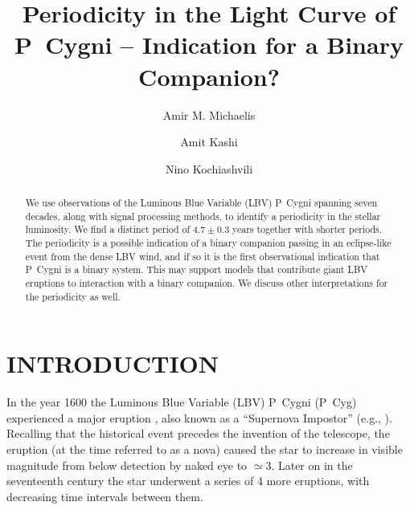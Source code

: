 \documentclass[twocolumn]{aastex62}
\begin{document}
\title{Periodicity in the Light Curve of P~Cygni -- Indication for a Binary Companion?}

\author[0000-0002-1361-9115]{Amir M. Michaelis}
\author[0000-0002-7840-0181]{Amit Kashi}
\author[0000-0001-5249-4354]{Nino Kochiashvili}





\begin{abstract}
We use observations of the Luminous Blue Variable (LBV) P~Cygni spanning seven decades, along with signal processing methods, to identify a periodicity in the stellar luminosity. 
We find a distinct period of $4.7 \pm 0.3$ years together with shorter periods.
The periodicity is a possible indication of a binary companion passing in an eclipse-like event from the dense LBV wind, and if so it is the first observational indication that P~Cygni is a binary system. This may support models that contribute giant LBV eruptions to interaction with a binary companion.
We discuss other interpretations for the periodicity as well.
\end{abstract}


\section{INTRODUCTION}
\label{sec:intro}

In the year 1600 the Luminous Blue Variable (LBV) P~Cygni (P~Cyg) experienced a major eruption \citep{deGroot1969,deGroot1988}, also known as a ``Supernova Impostor'' (e.g., \citealt{DavidsonHumphreys2012}).
Recalling that the historical event precedes the invention of the telescope,
the eruption (at the time referred to as a nova) caused the star to increase in visible magnitude from below detection by naked eye to $\simeq 3$.
Later on in the seventeenth century the star underwent a series of 4 more eruptions, with decreasing time intervals between them.
\end{document}
